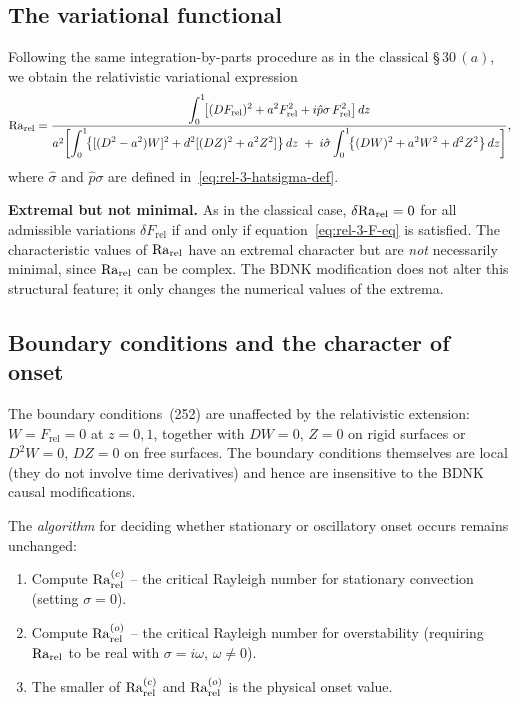 \subsection{The variational functional}

Following the same integration-by-parts procedure as in the classical
\S\,30\,$(a)$, we obtain the relativistic variational expression
\begin{equation}\label{eq:rel-3-Rvar}
  \mathrm{Ra}_{\mathrm{rel}}
  = \frac{\displaystyle\int_{0}^{1}\!
      \bigl[(DF_{\mathrm{rel}})^{2}
        + a^{2}F_{\mathrm{rel}}^{2}
        + i\hat{p}\sigma\,F_{\mathrm{rel}}^{2}
      \bigr]\,dz}
    {a^{2}\!\left[
      \displaystyle\int_{0}^{1}\!\bigl\{
        [(D^{2}-a^{2})W]^{2}
        + d^{2}[(DZ)^{2}+a^{2}Z^{2}]
      \bigr\}\,dz
      \;+\; i\hat{\sigma}
      \displaystyle\int_{0}^{1}\!\bigl\{
        (DW)^{2}+a^{2}W^{2}+d^{2}Z^{2}
      \bigr\}\,dz
    \right]},
\end{equation}
where $\hat{\sigma}$ and $\hat{p}\sigma$ are defined
in~\eqref{eq:rel-3-hatsigma-def}.

\begin{relcorrection}
\textbf{Extremal but not minimal.}\quad
As in the classical case, $\delta\mathrm{Ra}_{\mathrm{rel}} = 0$ for all admissible
variations $\delta F_{\mathrm{rel}}$ if and only if
equation~\eqref{eq:rel-3-F-eq} is satisfied.  The characteristic values
of $\mathrm{Ra}_{\mathrm{rel}}$ have an extremal character but are \emph{not} necessarily
minimal, since $\mathrm{Ra}_{\mathrm{rel}}$ can be complex.  The BDNK
modification does not alter this structural feature; it only changes
the numerical values of the extrema.
\end{relcorrection}

\subsection{Boundary conditions and the character of onset}

The boundary conditions~(252) are unaffected by the relativistic
extension: $W = F_{\mathrm{rel}} = 0$ at $z=0,1$, together with
$DW=0$, $Z=0$ on rigid surfaces or $D^{2}W=0$, $DZ=0$ on free
surfaces.  The boundary conditions themselves are local (they do not
involve time derivatives) and hence are insensitive to the
BDNK causal modifications.

The \emph{algorithm} for deciding whether stationary or oscillatory
onset occurs remains unchanged:
\begin{enumerate}
  \item Compute $\mathrm{Ra}_{\mathrm{rel}}^{(c)}$ -- the critical Rayleigh number for
    stationary convection (setting $\sigma=0$).
  \item Compute $\mathrm{Ra}_{\mathrm{rel}}^{(o)}$ -- the critical Rayleigh number for
    overstability (requiring $\mathrm{Ra}_{\mathrm{rel}}$ to be real with
    $\sigma = i\omega$, $\omega\ne 0$).
  \item The smaller of $\mathrm{Ra}_{\mathrm{rel}}^{(c)}$ and $\mathrm{Ra}_{\mathrm{rel}}^{(o)}$ is the
    physical onset value.
\end{enumerate}

